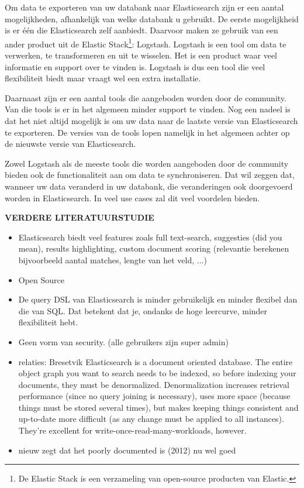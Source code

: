 {Om data te exporteren van uw databank naar Elasticsearch zijn er een aantal mogelijkheden, afhankelijk van welke databank u gebruikt. De eerste mogelijkheid is er één die Elasticsearch zelf aanbiedt. Daarvoor maken ze gebruik van een ander product uit de Elastic Stack\footnote{De Elastic Stack is een verzameling van open-source producten van Elastic.}: Logstash. Logstash is een tool om data te verwerken, te transformeren en uit te wisselen. Het is een product waar veel informatie en support over te vinden is. Logstash is dus een tool die veel flexibiliteit biedt maar vraagt wel een extra installatie. 

Daarnaast zijn er een aantal tools die aangeboden worden door de community. Van die tools is er in het algemeen minder support te vinden. Nog een nadeel is dat het niet altijd mogelijk is om uw data naar de laatste versie van Elasticsearch te exporteren. De versies van de tools lopen namelijk in het algemeen achter op de nieuwste versie van Elasticsearch. 

Zowel Logstash als de meeste tools die worden aangeboden door de community bieden ook de functionaliteit aan om data te synchroniseren. Dat wil zeggen dat, wanneer uw data veranderd in uw databank, die veranderingen ook doorgevoerd worden in Elasticsearch. In veel use cases zal dit veel voordelen bieden. 

\textbf{VERDERE LITERATUURSTUDIE}

\begin{itemize}
	\item Elasticsearch biedt veel features zoals full text-search, suggesties (did you mean), results highlighting, custom document scoring (relevantie berekenen bijvoorbeeld aantal matches, lengte van het veld, ...) 
	\item Open Source
	\item De query DSL van Elasticsearch is minder gebruikelijk en minder flexibel dan die van SQL. Dat betekent dat je, ondanks de hoge leercurve, minder flexibiliteit hebt.  
	\item Geen vorm van security. (alle gebruikers zijn super admin) 
	\item relaties: Bresetvik Elasticsearch is a document oriented database. The entire object graph you want to search needs to be indexed, so before indexing your documents, they must be denormalized. Denormalization increases retrieval performance (since no query joining is necessary), uses more space (because things must be stored several times), but makes keeping things consistent and up-to-date more difficult (as any change must be applied to all instances). They're excellent for write-once-read-many-workloads, however.
	\item nieuw zegt dat het poorly documented is (2012) nu wel goed
\end{itemize}




}
